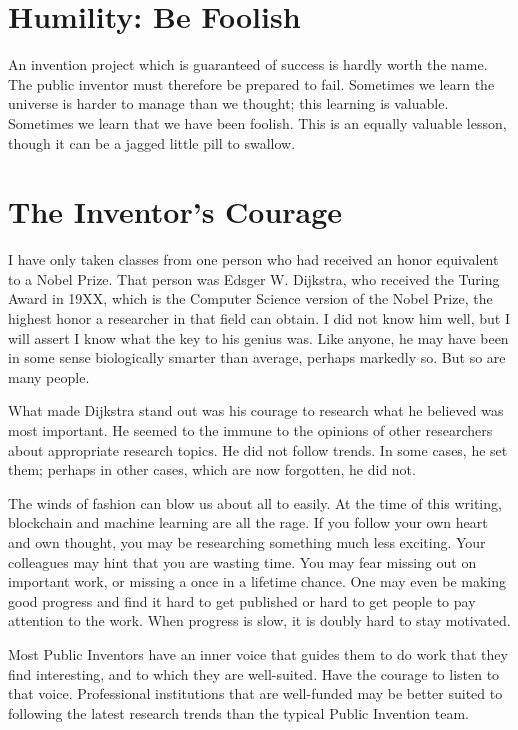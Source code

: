 \documentclass[
	fontsize=10pt, %
	twoside=false, %
	secnumdepth=1, %
]{kaobook}
\begin{document}
\section{Humility: Be Foolish}

An invention project which is guaranteed of success is hardly worth the name.
The public inventor must therefore be prepared to fail.
Sometimes we learn the universe is harder to manage than we thought;
this learning is valuable.
Sometimes we learn that we have been foolish.
This is an equally valuable lesson, though it can be a jagged little pill
to swallow.

\section{The Inventor's Courage}

I have only taken classes from one person who had received an honor equivalent to a Nobel Prize.
That person was Edsger W. Dijkstra, who received the Turing Award in 19XX, which is the Computer Science
version of the Nobel Prize, the highest honor a researcher in that field can obtain.
I did not know him well, but I will assert I know what the key to his genius was.
Like anyone, he may have been in some sense biologically smarter than average, perhaps markedly so.
But so are many people.

What made Dijkstra stand out was his courage to research what he believed was most important.
He seemed to the immune to the opinions of other researchers about appropriate research topics.
He did not follow trends. In some cases, he set them; perhaps in other cases, which are now forgotten,
he did not.

The winds of fashion can blow us about all to easily. At the time of this writing,
blockchain and machine learning are all the rage.
If you follow your own heart and own thought, you may be researching something
much less exciting.
Your colleagues may hint that you are wasting time.
You may fear missing out on important work, or missing a once in a lifetime chance.
One may even be making good progress and find it hard to get published or hard
to get people to pay attention to the work. When progress is slow, it is doubly
hard to stay motivated.

Most Public Inventors have an inner voice that guides them to do work that they
find interesting, and to which they are well-suited.
Have the courage to listen to that voice.
Professional institutions that are well-funded may be
better suited to following the latest research trends than the typical Public Invention team.
\end{document}
